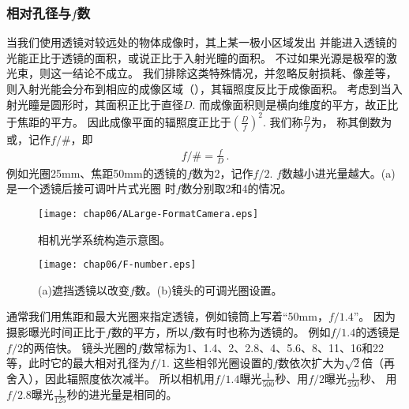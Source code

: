 \subsubsection{相对孔径与$f$数}
当我们使用透镜对较远处的物体成像时，其上某一极小区域发出
并能进入透镜的光能正比于透镜的面积，或说正比于入射光瞳的面积。
不过如果光源是极窄的激光束，则这一结论不成立。
我们排除这类特殊情况，并忽略反射损耗、像差等，
则入射光能会分布到相应的成像区域（），其辐照度反比于成像面积。
考虑到当入射光瞳是圆形时，其面积正比于直径$D$.
而成像面积则是横向维度的平方，故正比于焦距的平方。
因此成像平面的辐照度正比于$\displaystyle\left(\frac{D}{f}\right)^2$.
我们称$\displaystyle\frac{D}{f}$为，
称其倒数为或，记作$f/\#$，即
\begin{align}
    f/\#=\frac{f}{D}\, .
\end{align}
例如光圈25mm、焦距50mm的透镜的$f$数为2，记作$f/2$.
$f$数越小进光量越大。(a)是一个透镜后接可调叶片式光圈
时$f$数分别取2和4的情况。
\begin{figure}[htbp]
    \centering\texttt{[image: chap06/ALarge-FormatCamera.eps]}
    \caption{相机光学系统构造示意图。}
    \label{fig:6.52}
\end{figure}
\begin{figure}[htbp]
    \centering\texttt{[image: chap06/F-number.eps]}
    \caption{(a)遮挡透镜以改变$f$数。(b)镜头的可调光圈设置。}
    \label{fig:6.53}
\end{figure}

通常我们用焦距和最大光圈来指定透镜，例如镜筒上写着“50mm，$f/1.4$”。
因为摄影曝光时间正比于$f$数的平方，所以$f$数有时也称为透镜的。
例如$f/1.4$的透镜是$f/2$的两倍快。
镜头光圈的$f$数常标为1、1.4、2、2.8、4、5.6、8、11、16和22等，此时它的最大相对孔径为$f/1$.
这些相邻光圈设置的$f$数依次扩大为$\sqrt{2}$倍（再舍入），因此辐照度依次减半。
所以相机用$f/1.4$曝光$\displaystyle\frac{1}{500}$秒、用$f/2$曝光$\displaystyle\frac{1}{250}$秒、
用$f/2.8$曝光$\displaystyle\frac{1}{125}$秒的进光量是相同的。
